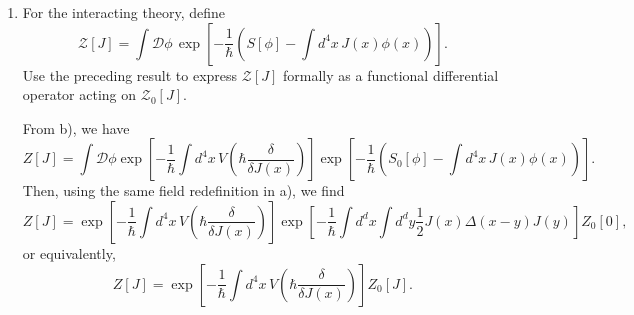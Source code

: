 \begin{enumerate}[label=\alph*)]
    \item For the interacting theory, define
    \begin{equation}
        \mathcal Z[J]
        =\int\mathcal D\phi\,
        \exp\!\left[
            -\frac{1}{\hbar}
            \left(
                S[\phi]-\int d^4x\,J(x)\phi(x)
            \right)
        \right].
    \end{equation}
    Use the preceding result to express $\mathcal Z[J]$ formally as a functional
    differential operator acting on $\mathcal Z_0[J]$.
    \begin{solution}
        From b), we have
        \begin{equation}
            Z[J] = \int \mathcal{D}\phi\exp\!\left[
            -\frac{1}{\hbar}\int d^4x\,
            V\!\left(\hbar\frac{\delta}{\delta J(x)}\right)
        \right]\exp\!\left[
            -\frac{1}{\hbar}
            \left(
                S_0[\phi]-\int d^4x\,J(x)\phi(x)
            \right)
        \right].
        \end{equation}
        Then, using the same field redefinition in a), we find
        \begin{equation}
            Z[J] = \exp\!\left[
            -\frac{1}{\hbar}\int d^4x\,
            V\!\left(\hbar\frac{\delta}{\delta J(x)}\right)
        \right]\exp\left[-\frac{1}{\hbar}\int d^dx\int d^dy \frac{1}{2}J(x)\Delta(x-y)J(y)\right]Z_0[0],
        \end{equation}
        or equivalently,
        \begin{equation}
            Z[J] = \exp\!\left[
            -\frac{1}{\hbar}\int d^4x\,
            V\!\left(\hbar\frac{\delta}{\delta J(x)}\right)
        \right]Z_0[J].
        \end{equation}
    \end{solution}


\end{enumerate}
